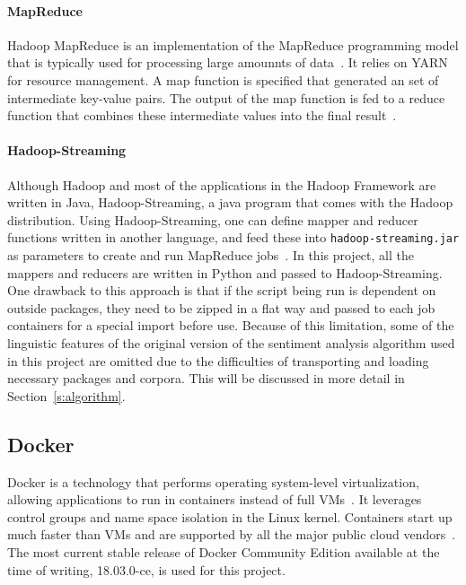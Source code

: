 \paragraph{MapReduce} Hadoop MapReduce is an implementation of the 
MapReduce programming model that is typically used for processing
large amounnts of data~\cite{hid-sp18-405-hadoop-official}. It relies
on YARN for resource management. A map function is specified that
generated an set of intermediate key-value pairs. The output of the
map function is fed to a reduce function that combines these
intermediate values into the final
result~\cite{hid-sp18-405-dean2008mapreduce}.

\paragraph{Hadoop-Streaming} Although Hadoop and most of the
applications in the Hadoop Framework are written in Java,
Hadoop-Streaming, a java program that comes with the Hadoop
distribution. Using Hadoop-Streaming, one can define mapper and
reducer functions written in another language, and feed these
into \verb|hadoop-streaming.jar| as parameters to create and run
MapReduce jobs~\cite{hid-sp18-405-hadoop-streaming}. In this project,
all the mappers and reducers are written in Python and passed to
Hadoop-Streaming. One drawback to this approach is that if the script
being run is dependent on outside packages, they need to be zipped in
a flat way and passed to each job containers for a special import
before use.  Because of this limitation, some of the linguistic
features of the original version of the sentiment analysis algorithm
used in this project are omitted due to the difficulties of
transporting and loading necessary packages and corpora. This will be
discussed in more detail in Section~\ref{s:algorithm}.


\subsection{Docker}
Docker is a technology that performs operating system-level
virtualization, allowing applications to run in containers instead of
full VMs~\cite{hid-sp18-405-docker-wiki}. It leverages control groups
and name space isolation in the Linux kernel. Containers start up much
faster than VMs and are supported by all the major public cloud
vendors~\cite{Foster:2017:CCS:3158276}. The most current stable
release of Docker Community Edition available at the time of writing,
18.03.0-ce, is used for this project.


